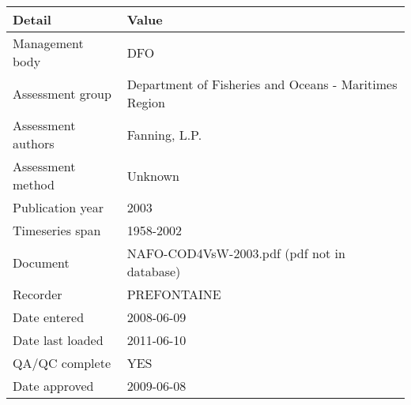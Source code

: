 \begin{table}[htb]
\centering
\begin{tabular}{lp{7cm}}
\toprule
Detail & Value \\
\midrule
Management body    & DFO                                                   \\
Assessment group   & Department of Fisheries and Oceans - Maritimes Region \\
Assessment authors & Fanning, L.P.                                         \\
Assessment method  & Unknown                                               \\
Publication year   & 2003                                                  \\
Timeseries span    & 1958-2002                                             \\
Document           & NAFO-COD4VsW-2003.pdf (pdf not in database)           \\
Recorder           & PREFONTAINE                                           \\
Date entered       & 2008-06-09                                            \\
Date last loaded   & 2011-06-10                                            \\
QA/QC complete     & YES                                                   \\
Date approved      & 2009-06-08                                            \\
\bottomrule
\end{tabular}
\label{tab:assessdet}
\end{table}
